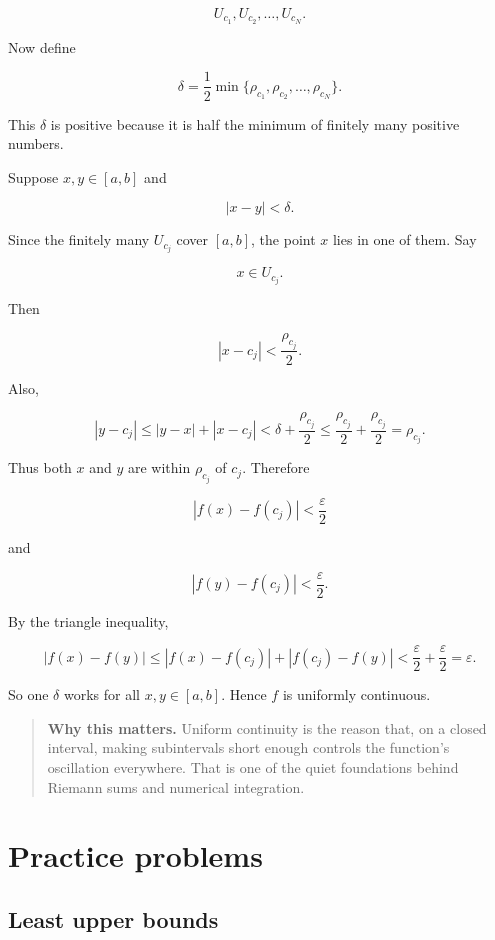 \[
U_{c_1},U_{c_2},\ldots,U_{c_N}.
\]

Now define

\[
\delta=\frac12\min\{\rho_{c_1},\rho_{c_2},\ldots,\rho_{c_N}\}.
\]

This \(\delta\) is positive because it is half the minimum of finitely many positive
numbers.

Suppose \(x,y\in[a,b]\) and

\[
|x-y|<\delta.
\]

Since the finitely many \(U_{c_j}\) cover \([a,b]\), the point \(x\) lies in one of them.
Say

\[
x\in U_{c_j}.
\]

Then

\[
|x-c_j|<\frac{\rho_{c_j}}{2}.
\]

Also,

\[
|y-c_j|
\le
|y-x|+|x-c_j|
<
\delta+\frac{\rho_{c_j}}{2}
\le
\frac{\rho_{c_j}}{2}+\frac{\rho_{c_j}}{2}
=
\rho_{c_j}.
\]

Thus both \(x\) and \(y\) are within \(\rho_{c_j}\) of \(c_j\).  Therefore

\[
|f(x)-f(c_j)|<\frac{\varepsilon}{2}
\]

and

\[
|f(y)-f(c_j)|<\frac{\varepsilon}{2}.
\]

By the triangle inequality,

\[
|f(x)-f(y)|
\le
|f(x)-f(c_j)|+|f(c_j)-f(y)|
<
\frac{\varepsilon}{2}+\frac{\varepsilon}{2}
=
\varepsilon.
\]

So one \(\delta\) works for all \(x,y\in[a,b]\).  Hence \(f\) is uniformly continuous.

\begin{quote}
\textbf{Why this matters.}
Uniform continuity is the reason that, on a closed interval, making subintervals short
enough controls the function's oscillation everywhere.  That is one of the quiet
foundations behind Riemann sums and numerical integration.
\end{quote}

\section{Practice problems}
\label{appsec:proofs-completeness-practice}

\subsection*{Least upper bounds}


